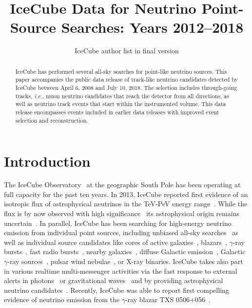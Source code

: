 \documentclass[aps,10pt,prd,twocolumn,floats,letterpaper,showpacs,nofootinbib,bibnotes,notitlepage,superscriptaddress,floatfix]{revtex4-1}
\newcommand{\MA}[1]{{\color{magenta}#1}}
\begin{document}
\title{IceCube Data for Neutrino Point-Source Searches: Years 2012--2018}

\author{\MA{IceCube author list in final version}}
%
\noaffiliation

\pacs{}

\begin{abstract}
IceCube has performed several all-sky searches for point-like neutrino sources. This paper accompanies the public data release of track-like neutrino candidates detected by IceCube between April 6, 2008 and July 10, 2018. The selection includes through-going tracks, {\it i.e.}, muon neutrino candidates that reach the detector from all directions, as well as neutrino track events that start within the instrumented volume. This data release encompasses events included in earlier data releases with improved event selection and reconstruction.
\end{abstract}

\maketitle

\section{Introduction}

The IceCube Observatory~\cite{Aartsen:2016nxy} at the geographic South Pole has been operating at full capacity for the past ten years. In 2013, IceCube reported first evidence of an isotropic flux of astrophysical neutrinos in the TeV-PeV energy range~\cite{Aartsen:2013bka,Aartsen:2013jdh}. While the flux is by now observed with high significance~\cite{Aartsen:2014gkd,Aartsen:2015rwa,Aartsen:2016xlq,IceCube:2018dnn,IceCube:2018cha} its astrophysical origin remains uncertain~\cite{Ahlers:2018fkn}. In parallel, IceCube has been searching for high-energy neutrino emission from individual point sources, including unbiased all-sky searches~\cite{Abbasi:2010rd,Aartsen:2013uuv,Aartsen:2014cva,Aartsen:2014cva,Aartsen:2018ywr,Aartsen:2019fau} as well as individual source candidates like cores of active galaxies~\cite{Bradascio:2019xdd}, blazars~\cite{Aartsen:2016lir}, $\gamma$-ray bursts~\cite{Abbasi:2012zw,Aartsen:2014aqy,Aartsen:2016qcr,Aartsen:2017wea}, fast radio bursts~\cite{Aartsen:2017zvw}, nearby galaxies~\cite{Aartsen:2019xkn}, diffuse Galactic emission~\cite{Albert:2018vxw}, Galactic $\gamma$-ray sources~\cite{Kheirandish:2019bke}, pulsar wind nebulae~\cite{Aartsen:2020eof}, or X-ray binaries\cite{Abbasi:2011ke}. IceCube takes also part in various realtime multi-messenger activities via the fast response to external alerts in photons~\cite{Abbasi:2011ja,Aartsen:2015trq} or gravitational waves~\cite{Adrian-Martinez:2016xgn,ANTARES:2017iky,Aartsen:2020mla} and by providing astrophysical neutrino candidates~\cite{Aartsen:2016lmt,AyalaSolares:2020ing}. Recently, IceCube was able to report first compelling evidence of neutrino emission from the $\gamma$-ray blazar TXS 0506+056~\cite{Finley:2019vpk,IceCube:2018cha}.
\end{document}
